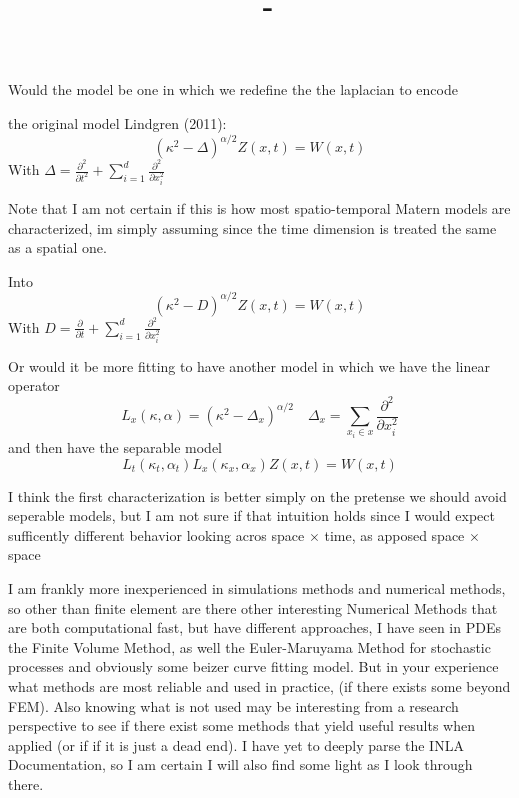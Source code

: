 \documentclass[answers,12pt,addpoints]{exam}
\author{\name}
\title{\course \ - \assignment}
\begin{document}
\maketitle

\newpage
\begin{questions}
\question Would the model be one in which we redefine the the laplacian to encode  

the original model Lindgren (2011):
$$ (\kappa^2 - \Delta)^{\alpha/2} Z(x,t) = W(x,t)$$
With $\Delta = \frac{\partial^2}{\partial t^2} + \sum_{i = 1}^d \frac{\partial^2}{\partial x_i^2}$

Note that I am not certain if this is how most spatio-temporal Matern models are characterized, im simply assuming since the time dimension is treated the same as a spatial one.

Into 
$$ (\kappa^2 - D)^{\alpha/2} Z(x,t) = W(x,t)$$
With $D = \frac{\partial}{\partial t} + \sum_{i = 1}^d \frac{\partial^2}{\partial x_i^2}$ 

Or would it be more fitting to have another model in which we have the linear operator
$$ L_x(\kappa, \alpha) = (\kappa^2 - \Delta_x)^
{\alpha/2} \quad \Delta_x = \sum_{x_i \in x} \frac{\partial^2}{\partial x_i^2}$$
and then have the separable model 
$$ L_t(\kappa_t, \alpha_t) L_x(\kappa_x, \alpha_x)Z(x,t) = W(x,t)$$

I think the first characterization is better simply on the pretense we should avoid seperable models, but I am not sure if that intuition holds since I would expect sufficently different behavior looking acros space $\times$ time, as apposed space $\times$ space

\question I am frankly more inexperienced in simulations methods and numerical methods, so other than finite element are there other interesting Numerical Methods that are both computational fast, but have different approaches, I have seen in PDEs the Finite Volume Method, as well the Euler-Maruyama Method for stochastic processes and obviously some beizer curve fitting model. But in your experience what methods are most reliable and used in practice, (if there exists some beyond FEM). Also knowing what is not used may be interesting from a research perspective to see if there exist some methods that yield useful results when applied (or if if it is just a dead end). I have yet to deeply parse the INLA Documentation, so I am certain I will also find some light as I look through there.

\end{questions}
\end{document}
